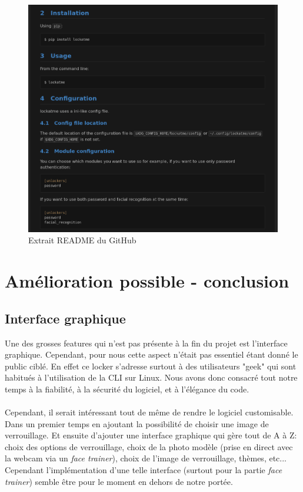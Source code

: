 \documentclass[french]{report}
\begin{document}
\begin{figure}[h]\label{fig:readme}
  \includegraphics[width=\linewidth]{readme}
  \caption{Extrait README du GitHub}
  \label{fig:readme}
\end{figure}


\chapter{Amélioration possible - conclusion}

\newpage

\section{Interface graphique}
Une des grosses features qui n'est pas présente à la fin du projet est l'interface
graphique. Cependant, pour nous cette aspect n'était pas essentiel étant donné le public ciblé.
En effet ce locker s'adresse surtout à des utilisateurs "geek" qui sont habitués à
l'utilisation de la CLI sur Linux. Nous avons donc consacré tout notre temps à
la fiabilité, à la sécurité du logiciel, et à l'élégance du code.\\\\
Cependant, il serait intéressant tout de même de rendre le logiciel customisable.
Dans un premier temps en ajoutant la possibilité de choisir une image de verrouillage.
Et ensuite d'ajouter une interface graphique qui gère tout de A à Z: choix des options
de verrouillage, choix de la photo modèle (prise en direct avec la webcam via un \emph{face trainer}), choix de
l'image de verrouillage, thèmes, etc...\\
Cependant l'implémentation d'une telle interface (surtout pour la partie \emph{face trainer})
semble être pour le moment en dehors de notre portée.
\end{document}
